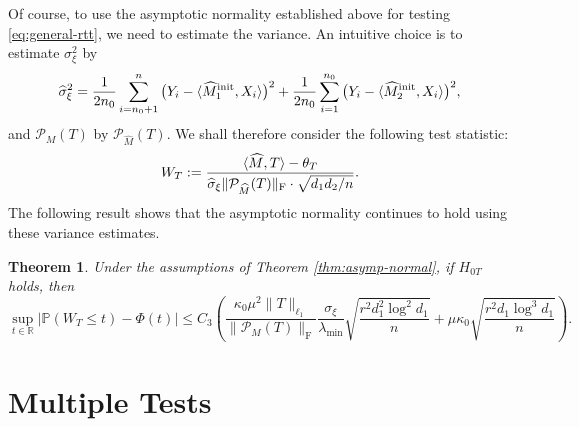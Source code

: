 \documentclass[12pt]{article}
\newcommand{\tF}{{\rm F}}
\newcommand{\cP}{\mathcal{P}}
\newtheorem{Theorem}{Theorem}
\theoremstyle{plain}
\begin{document}
\begin{sloppypar}
Of course, to use the asymptotic normality established above for testing \eqref{eq:general-rtt}, we need to estimate the variance. An intuitive choice is to estimate $\sigma_\xi^2$ by
$$
\widehat{\sigma}_{\xi}^2= \frac{1}{2n_0}\sum_{i=n_0+1}^{n}\big(Y_i-\langle \widehat{M}_1^{\rm init}, X_i\rangle\big)^2+\frac{1}{2n_0}\sum_{i=1}^{n_0}\big(Y_i-\langle \widehat{ M}_2^{\rm init}, X_i\rangle \big)^2,
$$
and $\cP_M(T)$ by $\cP_{\widehat{M}}(T)$. We shall therefore consider the following test statistic:
$$
W_T:=\frac{\langle \widehat{M}, T\rangle-\theta_T}{\widehat{\sigma}_{\xi}\|\cP_{\widehat{M}}(T) \|_\tF \cdot \sqrt{d_1 d_2 / n}}.
$$
The following result shows that the asymptotic normality continues to hold using these variance estimates.

\begin{Theorem}\label{thm:asymp-normal-varest} 
	Under the assumptions of Theorem \ref{thm:asymp-normal}, if $H_{0T}$ holds, then
$$
\sup _{t\in \mathbb{R}}\left|\mathbb{P}\left(W_{T} \leq t\right)-\Phi\left(t\right)\right|
\le C_3\left(  \frac{ \kappa_0 \mu^2 \|T\|_{\ell_1} }{ \|\cP_M(T)\|_{\mathrm{F}} } \frac{\sigma_{\xi}  }{\lambda_{\min} } \sqrt{\frac{ r^2 d_1^2 \log ^2 d_1}{n}} + \mu \kappa_0 \sqrt{\frac{r^2 d_1 \log ^3 d_1}{n}}\right). %
$$
\end{Theorem}

\section{Multiple Tests}\label{sec:FDR-SDA}


\end{sloppypar}
\end{document}
